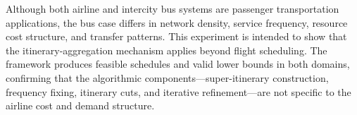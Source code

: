 Although both airline and intercity bus systems are passenger transportation applications, the bus case differs in network density, service frequency, resource cost structure, and transfer patterns. This experiment is intended to show that the itinerary-aggregation mechanism applies beyond flight scheduling. The \algoNotation framework produces feasible schedules and valid lower bounds in both domains, confirming that the algorithmic components---super-itinerary construction, frequency fixing, itinerary cuts, and iterative refinement---are not specific to the airline cost and demand structure.